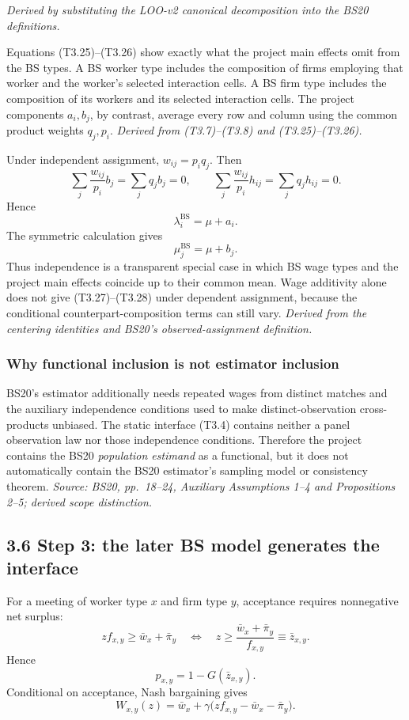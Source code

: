 \documentclass[11pt]{article}
\begin{document}
\textit{Derived by substituting the LOO-v2 canonical decomposition into the
BS20 definitions.}

Equations (T3.25)--(T3.26) show exactly what the project main effects omit from
the BS types.  A BS worker type includes the composition of firms employing
that worker and the worker's selected interaction cells.  A BS firm type
includes the composition of its workers and its selected interaction cells.
The project components \(a_i,b_j\), by contrast, average every row and column
using the common product weights \(q_j,p_i\).
\textit{Derived from (T3.7)--(T3.8) and (T3.25)--(T3.26).}

Under independent assignment, \(w_{ij}=p_iq_j\).  Then
\[
\sum_j\frac{w_{ij}}{p_i}b_j=\sum_jq_jb_j=0,
\qquad
\sum_j\frac{w_{ij}}{p_i}h_{ij}=\sum_jq_jh_{ij}=0.
\]
Hence
\[
\lambda_i^{\mathrm{BS}}=\mu+a_i.
\tag{T3.27}
\]
The symmetric calculation gives
\[
\mu_j^{\mathrm{BS}}=\mu+b_j.
\tag{T3.28}
\]
Thus independence is a transparent special case in which BS wage types and
the project main effects coincide up to their common mean.  Wage additivity
alone does not give (T3.27)--(T3.28) under dependent assignment, because the
conditional counterpart-composition terms can still vary.
\textit{Derived from the centering identities and BS20's observed-assignment
definition.}

\subsubsection{Why functional inclusion is not estimator inclusion}

BS20's estimator additionally needs repeated wages from distinct matches and
the auxiliary independence conditions used to make distinct-observation
cross-products unbiased.  The static interface (T3.4) contains neither a
panel observation law nor those independence conditions.  Therefore the
project contains the BS20 \emph{population estimand} as a functional, but it
does not automatically contain the BS20 estimator's sampling model or
consistency theorem.
\textit{Source: BS20, pp.\ 18--24, Auxiliary Assumptions 1--4 and
Propositions 2--5; derived scope distinction.}

\subsection{3.6 Step 3: the later BS model generates the interface}

For a meeting of worker type \(x\) and firm type \(y\), acceptance requires
nonnegative net surplus:
\[
zf_{x,y}\geq\bar w_x+\bar\pi_y
\quad\Longleftrightarrow\quad
z\geq
\frac{\bar w_x+\bar\pi_y}{f_{x,y}}
\equiv\bar z_{x,y}.
\tag{T3.31}
\]
Hence
\[
p_{x,y}=1-G(\bar z_{x,y}).
\tag{T3.32}
\]
Conditional on acceptance, Nash bargaining gives
\[
W_{x,y}(z)
=
\bar w_x+\gamma
\bigl(zf_{x,y}-\bar w_x-\bar\pi_y\bigr).
\tag{T3.33}
\]
\end{document}

